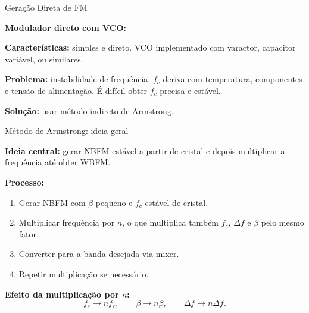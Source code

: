 \begin{frame}{Geração Direta de FM}

\textbf{Modulador direto com VCO:}

\begin{center}
\end{center}

\textbf{Características:} simples e direto. VCO implementado com varactor, capacitor variável, ou similares.

\pause
\vspace{0.2cm}
\textbf{Problema:} instabilidade de frequência. $f_c$ deriva com temperatura, componentes e tensão de alimentação. É difícil obter $f_c$ precisa e estável.

\pause
\textbf{Solução:} usar método indireto de Armstrong.

\end{frame}


\begin{frame}{Método de Armstrong: ideia geral}

\textbf{Ideia central:} gerar NBFM estável a partir de cristal e depois multiplicar a frequência até obter WBFM.

\vspace{0.4cm}
\pause
\textbf{Processo:}

\begin{enumerate}
\item Gerar NBFM com $\beta$ pequeno e $f_c$ estável de cristal.
\item Multiplicar frequência por $n$, o que multiplica também $f_c$, $\Delta f$ e $\beta$ pelo mesmo fator.
\item Converter para a banda desejada via mixer.
\item Repetir multiplicação se necessário.
\end{enumerate}

\pause
\vspace{0.3cm}
\textbf{Efeito da multiplicação por $n$:}
\[
f_c \to n f_c, \qquad \beta \to n\beta, \qquad \Delta f \to n\Delta f.
\]

\end{frame}

